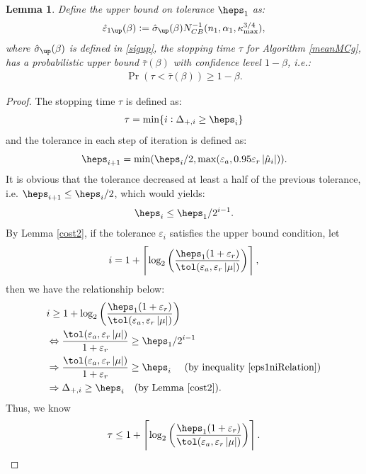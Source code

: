 \documentclass{iitthesis}
\newtheorem{lemma}[theorem]{Lemma}
\begin{document}
\begin{lemma}\label{tauprobbound}
Define the upper bound on tolerance $\heps_1$ as:
\begin{align}\label{eps1updef}
\hvareps_{1\up}(\beta):=\hsigma_{\up}(\beta) N_{CB}^{-1}(n_1,\alpha_1,\kappa_{\max}^{3/4}),
\end{align}
where $\hsigma_{\up}(\beta)$ is defined in \eqref{sigup}, the stopping time $\tau$ for Algorithm \ref{meanMCg}, has a probabilistic upper bound $\bar{\tau}(\beta)$ with confidence level $1-\beta$, i.e.:
\begin{align}
\Pr(\tau <\bar{\tau}(\beta)) \geq 1-\beta.
\end{align}
\end{lemma}
\begin{proof}
The stopping time $\tau$ is defined as:
 \begin{align}\label{st}
\tau = \min \{ i: \Delta_{+,i} \geq \heps_i \}
\end{align}
 and the tolerance in each step of iteration is defined as:
 $$\heps_{i+1} = \min(\heps_i/2, \max(\varepsilon_a,0.95\varepsilon_r\abs{\hmu_i})).$$ 
 It is obvious that the tolerance decreased at least a half of the previous tolerance, i.e.
$\heps_{i+1} \leq\heps_i/2$, which would yields: 
\begin{align}\label{eps1niRelation}
\heps_i \le\heps_1/2^{i-1}.
\end{align} 
By Lemma \ref{cost2}, if the tolerance $\varepsilon_i$ satisfies the upper bound condition, 
let $$i = 1+\left \lceil \log_{2} \left(\frac{\heps_{1}(1+\varepsilon_r)}{ \tol(\varepsilon_a,\varepsilon_r \abs{\mu})}\right) \right \rceil, $$
then we have the relationship below:
\begin{align}
& i \geq 1+\log_{2} \left(\frac{\heps_{1}(1+\varepsilon_r)}{ \tol(\varepsilon_a,\varepsilon_r \abs{\mu})}\right)\\&
\Leftrightarrow  \frac{\tol(\varepsilon_a, \varepsilon_r\abs{\mu})}{1+\varepsilon_r} \ge \heps_1/2^{i-1}\\
& \Rightarrow \frac{\tol(\varepsilon_a, \varepsilon_r\abs{\mu})}{1+\varepsilon_r} \ge \heps_i  \text{ \quad (by inequality \eqref{eps1niRelation}})\\&
\Rightarrow \Delta_{+, i} \ge \heps_{i} \text{\quad(by Lemma \ref{cost2})}.
\end{align}
Thus, we know
\begin{align}\label{taurel}
\tau \le  1+\left \lceil \log_{2} \left(\frac{\heps_{1}(1+\varepsilon_r)}{ \tol(\varepsilon_a,\varepsilon_r \abs{\mu})}\right) \right \rceil.

\end{align}
\end{proof}
\end{document}

